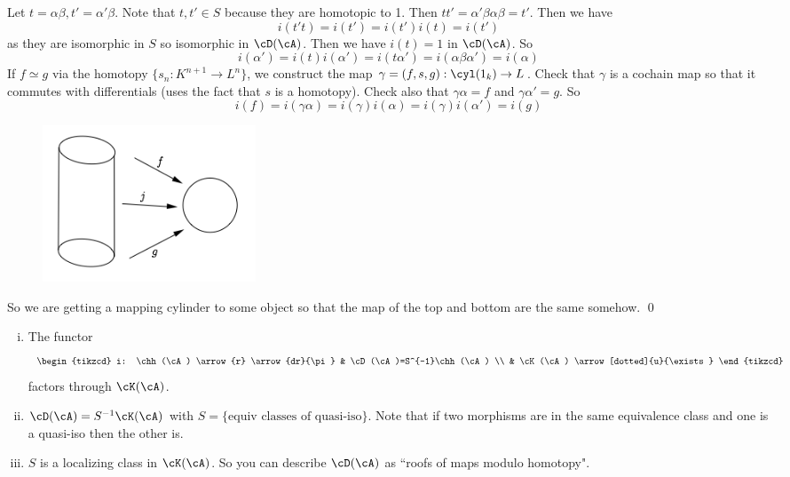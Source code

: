 Let $t=\alpha \beta,t'=\alpha'\beta$. Note that $t,t' \in S$ because they are homotopic to 1. Then $tt'=\alpha'\beta\alpha\beta=t'$. Then we have
\[
i(t't)=i(t')=i(t')i(t)=i(t')
\]
as they are isomorphic in $S$ so isomorphic in $\cD(\cA)$. Then we have $i(t)=1$ in $\cD(\cA)$. So
\[
i(\alpha')=i(t)i(\alpha')=i(t\alpha')=i(\alpha\beta\alpha')=i(\alpha)
\]
If $f \simeq g$ via the homotopy $\{s_n: K^{n+1} \to L^n\}$, we construct the map $\gamma=(f,s,g): \cyl(1_k) \to L$. Check that $\gamma$ is a cochain map so that it commutes with differentials (uses the fact that $s$ is a homotopy). Check also that $\gamma \alpha=f$ and $\gamma \alpha'=g$. So 
\[
i(f)=i(\gamma\alpha)=i(\gamma)i(\alpha)=i(\gamma)i(\alpha')=i(g)
\]

\begin{figure}[H] 
   \centering
   \includegraphics[width=2.5in]{images/p10.png} 
\end{figure}

So we are getting a mapping cylinder to some object so that the map of the top and bottom are the same somehow. \qed \\

\begin{thm}
\begin{enumerate}[(i)]
\item The functor 
\[
\begin{tikzcd}
i: \chh(\cA) \arrow{r} \arrow{dr}{\pi} & \cD(\cA)=S^{-1}\chh(\cA) \\
& \cK(\cA) \arrow[dotted]{u}{\exists}
\end{tikzcd}
\]
factors through $\cK(\cA)$. 

\item $\cD(\cA)=S^{-1}\cK(\cA)$ with $S=\{\text{equiv classes of quasi-iso}\}$. Note that if two morphisms are in the same equivalence class and one is a quasi-iso then the other is.

\item $S$ is a localizing class in $\cK(\cA)$. So you can describe $\cD(\cA)$ as ``roofs of maps modulo homotopy". 
\end{enumerate}
\end{thm}

